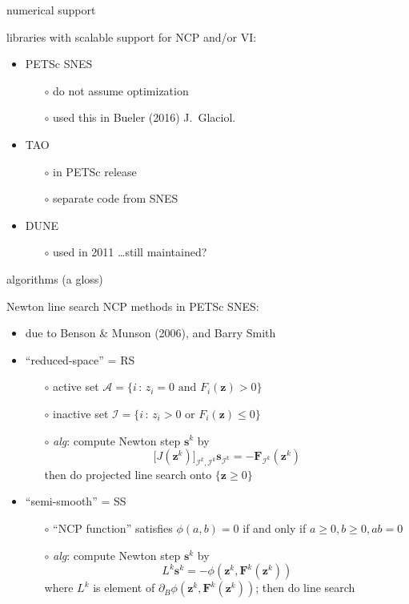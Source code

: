 \documentclass[xcolor={dvipsnames}]{beamer}
\newcommand\bs{\mathbf{s}}
\newcommand\bz{\mathbf{z}}
\newcommand\bF{\mathbf{F}}
\begin{document}
\begin{frame}{numerical support}

libraries with scalable support for NCP and/or VI:
\begin{itemize}
\item  PETSc SNES
  \begin{itemize}
  \item[$\circ$]  do not assume optimization
  \item[$\circ$]  used this in Bueler (2016) J.~Glaciol.
  \end{itemize}
\item  TAO
  \begin{itemize}
  \item[$\circ$]  in PETSc release
  \item[$\circ$]  separate code from SNES
  \end{itemize}
\item  DUNE
  \begin{itemize}
  \item[$\circ$]  used in 2011 \dots still maintained?
  \end{itemize}
\end{itemize}
\end{frame}


\begin{frame}{algorithms (a gloss)}

Newton line search NCP methods in PETSc SNES:
\begin{itemize}
\item  due to Benson \& Munson (2006), and Barry Smith
\item  ``reduced-space'' = \alert{RS}
    \begin{itemize}
    \item[$\circ$] active set $\mathcal{A} = \{i \,:\, z_i = 0 \text{ and } F_i(\bz) > 0\}$
    \item[$\circ$] inactive set $\mathcal{I} = \{i \,:\, z_i > 0 \text{ or } F_i(\bz) \le 0\}$
    \item[$\circ$] \emph{alg}: compute Newton step $\bs^k$ by
     $$\big[J(\bz^k)\big]_{\mathcal{I}^k,\mathcal{I}^k} \bs_{\mathcal{I}^k} = - \bF_{\mathcal{I}^k}(\bz^k)$$
     then do projected line search onto $\{\bz\ge 0\}$
    \end{itemize}
\item  ``semi-smooth'' = \alert{SS}
    \begin{itemize}
    \item[$\circ$] ``NCP function'' satisfies $\phi(a,b)=0$ if and only if $a\ge 0,b\ge 0,ab=0$
    \item[$\circ$] \emph{alg}: compute Newton step $\bs^k$ by
    $$L^k \bs^k = - \phi(\bz^k,\bF^k(\bz^k))$$
    where $L^k$ is element of $\partial_B \phi(\bz^k,\bF^k(\bz^k))$; then do line search
    \end{itemize}
\end{itemize}
\end{frame}
\end{document}
